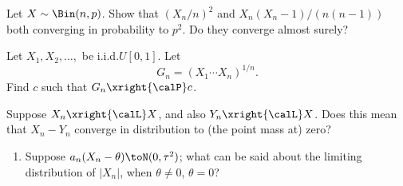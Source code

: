 \begin{problem}[DasGupta 7.17]
  Let \(X\sim\Bin(n,p)\). Show that \((X_n/n)^2\) and
  \(X_n(X_n-1)/(n(n-1))\) both converging in probability to \(p^2\). Do
  they converge almost surely?
\end{problem}
\begin{solution}

\end{solution}
\newpage

\begin{problem}[DasGupta 7.21]
  Let \(X_1,X_2,\dotsc,\) be i.i.d.\@ \(U[0,1]\). Let
  \[
    G_n=(X_1\dotsm X_n)^{1/n}.
  \]
  Find \(c\) such that \(G_n\xright{\calP} c\).
\end{problem}
\begin{solution}

\end{solution}
\newpage

\begin{problem}
  Suppose \(X_n\xright{\calL}X\), and also \(Y_n\xright{\calL} X\). Does
  this mean that \(X_n-Y_n\) converge in distribution to (the point mass
  at) zero?
\end{problem}
\begin{solution}

\end{solution}
\newpage

\begin{problem}[DasGupta 7.31 (a)]
  \begin{enumerate}[label=(\alph*),noitemsep]
  \item Suppose \(a_n(X_n-\theta)\toN(0,\tau^2)\); what can be said
    about the limiting distribution of \(|X_n|\), when \(\theta\neq 0\),
    \(\theta=0\)?
  \end{enumerate}
\end{problem}
\begin{solution}

\end{solution}

